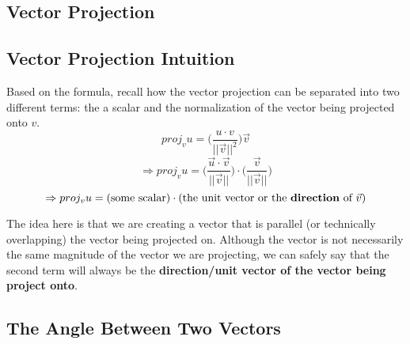 \documentclass{report}
\begin{document}
\begin{sloppypar}
\subsection{Vector Projection}
\begin{center}
\end{center}
\subsection{Vector Projection Intuition}
Based on the formula, recall how the vector
projection can be separated into two different
terms: the a scalar and the normalization of the vector being projected onto $ v $.
\[ proj_{v}u = \Biggr(\frac{u \cdot v}{||\vec{v}||^{2}} \Biggr)\vec{v} \]
\[ \Rightarrow proj_{v}u = \Biggr( \frac{\vec{u} \cdot \vec{v}}{||\vec{v}||}\Biggr) \cdot \Biggr( \frac{\vec{v}}{||\vec{v}||} \Biggr)\]
\[ \Rightarrow proj_{v}u = (\textrm{some scalar}) \cdot (\textrm{the unit vector or the \textbf{direction} of $\vec{v}$})\]

The idea here is that we are creating a vector
that is parallel (or technically overlapping) the
vector being projected on. Although the vector
is not necessarily the same magnitude of the
vector we are projecting, we can safely say
that the second term will always be the
\textbf{direction/unit vector of the vector
  being project onto}.

\subsection{The Angle Between Two Vectors}
\begin{center}
\end{center}

\end{sloppypar}
\end{document}
